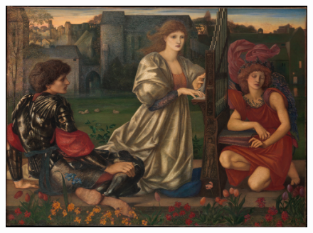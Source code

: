\cleartoleftpage{}
\begin{figure}[p!]
  \begingroup
  \centering
  \includegraphics[keepaspectratio,width=\textwidth]{figures/The-Love-Song-Edward-Burne-Jones-small.jpg}
  \label{fig:thelovesong}
\end{figure}

\clearpage{}
\thispagestyle{titleontop}

